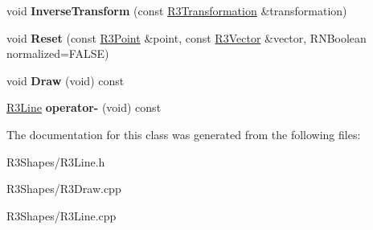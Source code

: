 \begin{DoxyCompactItemize}
\item 
void {\bfseries Inverse\+Transform} (const \hyperlink{class_r3_transformation}{R3\+Transformation} \&transformation)\hypertarget{class_r3_line_adcc394f67441dab5d2202442d407531f}{}\label{class_r3_line_adcc394f67441dab5d2202442d407531f}

\item 
void {\bfseries Reset} (const \hyperlink{class_r3_point}{R3\+Point} \&point, const \hyperlink{class_r3_vector}{R3\+Vector} \&vector, R\+N\+Boolean normalized=F\+A\+L\+SE)\hypertarget{class_r3_line_a8d9fea53e35a2c344fd985d223e0f8cc}{}\label{class_r3_line_a8d9fea53e35a2c344fd985d223e0f8cc}

\item 
void {\bfseries Draw} (void) const \hypertarget{class_r3_line_ac3aada07f6f35c5839e97a8077feb2cd}{}\label{class_r3_line_ac3aada07f6f35c5839e97a8077feb2cd}

\item 
\hyperlink{class_r3_line}{R3\+Line} {\bfseries operator-\/} (void) const \hypertarget{class_r3_line_a02c3e798e6a72d80db686be9ed3e99ec}{}\label{class_r3_line_a02c3e798e6a72d80db686be9ed3e99ec}

\end{DoxyCompactItemize}


The documentation for this class was generated from the following files\+:\begin{DoxyCompactItemize}
\item 
R3\+Shapes/R3\+Line.\+h\item 
R3\+Shapes/R3\+Draw.\+cpp\item 
R3\+Shapes/R3\+Line.\+cpp\end{DoxyCompactItemize}
